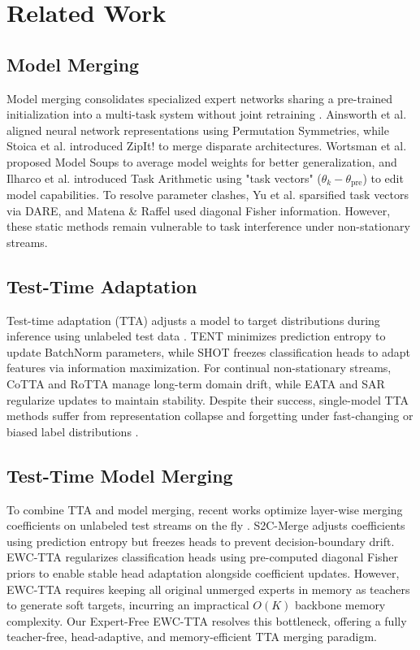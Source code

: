 \documentclass{article}
\theoremstyle{plain}
\theoremstyle{definition}
\theoremstyle{remark}
\begin{document}
\section{Related Work}
\label{sec:related}

\subsection{Model Merging}
Model merging consolidates specialized expert networks sharing a pre-trained initialization into a multi-task system without joint retraining \cite{wortsman2022model}. Ainsworth et al. \cite{ainsworth2022git} aligned neural network representations using Permutation Symmetries, while Stoica et al. \cite{stoica2023zip} introduced ZipIt! to merge disparate architectures. Wortsman et al. \cite{wortsman2022model} proposed Model Soups to average model weights for better generalization, and Ilharco et al. \cite{ilharco2022editing} introduced Task Arithmetic using "task vectors" ($\theta_k - \theta_{\text{pre}}$) to edit model capabilities. To resolve parameter clashes, Yu et al. \cite{yu2023language} sparsified task vectors via DARE, and Matena \& Raffel \cite{matena2022merging} used diagonal Fisher information. However, these static methods remain vulnerable to task interference under non-stationary streams.

\subsection{Test-Time Adaptation}
Test-time adaptation (TTA) adjusts a model to target distributions during inference using unlabeled test data \cite{wang2020tent, liang2020shot}. TENT \cite{wang2020tent} minimizes prediction entropy to update BatchNorm parameters, while SHOT \cite{liang2020shot} freezes classification heads to adapt features via information maximization. For continual non-stationary streams, CoTTA \cite{wang2022continual} and RoTTA \cite{yuan2023robust} manage long-term domain drift, while EATA \cite{niu2022efficient} and SAR \cite{niu2023towards} regularize updates to maintain stability. Despite their success, single-model TTA methods suffer from representation collapse and forgetting under fast-changing or biased label distributions \cite{goyal2023sharpness}.

\subsection{Test-Time Model Merging}
To combine TTA and model merging, recent works optimize layer-wise merging coefficients on unlabeled test streams on the fly \cite{shao2023test, nacke2023synergistic}. S2C-Merge \cite{choshen2022fusing} adjusts coefficients using prediction entropy but freezes heads to prevent decision-boundary drift. EWC-TTA regularizes classification heads using pre-computed diagonal Fisher priors to enable stable head adaptation alongside coefficient updates. However, EWC-TTA requires keeping all original unmerged experts in memory as teachers to generate soft targets, incurring an impractical $O(K)$ backbone memory complexity. Our Expert-Free EWC-TTA resolves this bottleneck, offering a fully teacher-free, head-adaptive, and memory-efficient TTA merging paradigm.
\end{document}
